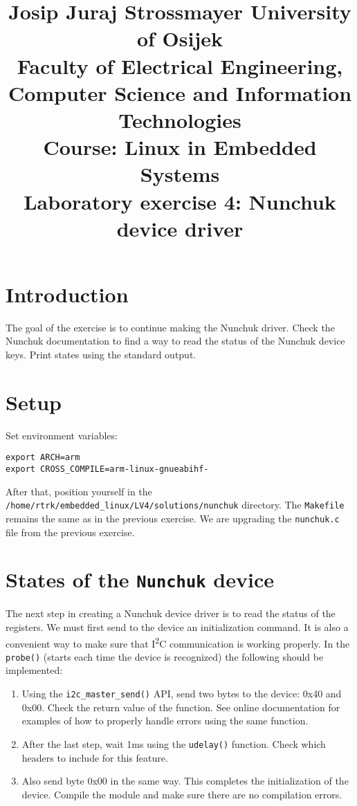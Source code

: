 \documentclass[11pt]{article}
\title{
	\Large Josip Juraj Strossmayer University of Osijek \\
	Faculty of Electrical Engineering, Computer Science and Information
	 Technologies\\
	\vspace{4cm}
	\Large Course: Linux in Embedded Systems \\
	\vspace{4cm}
	\Large \textbf{Laboratory exercise 4: Nunchuk device driver}
	}
\date{}
\begin{document}
\maketitle
\thispagestyle{empty}
\newpage

\section{Introduction}
The goal of the exercise is to continue making the Nunchuk driver.
Check the Nunchuk documentation to find a way to read the status of the Nunchuk
device keys. Print states using the standard output.

\section{Setup}
Set environment variables:
\begin{lstlisting}
export ARCH=arm
export CROSS_COMPILE=arm-linux-gnueabihf-
\end{lstlisting}
After that, position yourself in the
\texttt{/home/rtrk/embedded\_linux/LV4/solutions/nunchuk} directory. The
\texttt{Makefile} remains the same as in the previous exercise. We are upgrading
the \texttt{nunchuk.c} file from the previous exercise.

\section{States of the \texttt{Nunchuk} device}
The next step in creating a Nunchuk device driver is to read the status of the
registers. We must first send to the device an initialization command. It is
also a convenient way to make sure that I\textsuperscript{2}C communication is
working properly.
\newline
\newline
In the \texttt{probe()} (starts each time the device is recognized) the
following should be implemented:
\begin{enumerate}
	\item Using the \texttt{i2c\_master\_send()} API, send two bytes to the
		device: 0x40 and 0x00. Check the return value of the function. See
		online documentation for examples of how to properly handle errors using
		the same function.
	\item After the last step, wait 1ms using the \texttt{udelay()} function.
		Check which headers to include for this feature.
	\item Also send byte 0x00 in the same way. This completes the initialization
		of the device.
Compile the module and make sure there are no compilation errors.
\end{enumerate}
\end{document}
